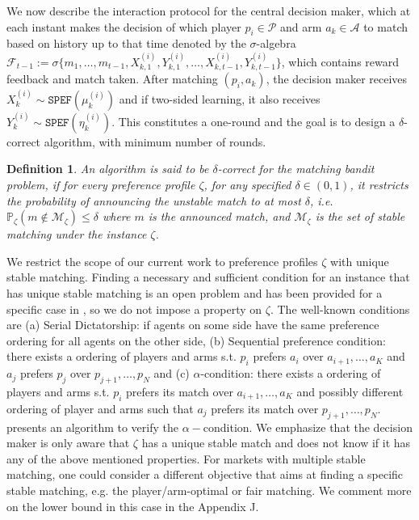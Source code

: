\documentclass{article}
\newtheorem{definition}[theorem]{Definition}
\begin{document}
We now describe the interaction protocol for the central decision maker, which at each instant makes the decision of which player $p_i\in \mathcal{P}$ and arm $a_k\in\mathcal{A}$ to match based on history up to that time denoted by the $\sigma$-algebra $\mathcal{F}_{t-1}:=\sigma\{m_{1},\ldots,m_{t-1},X^{(i)}_{k,1},Y^{(i)}_{k,1},\ldots,X^{(i)}_{k,t-1},Y^{(i)}_{k,t-1}\}$, which contains reward feedback and match taken. After matching $(p_i,a_k)$, the decision maker receives $X^{(i)}_k\sim\texttt{SPEF}(\mu^{(i)}_k)$ and if two-sided learning, it also receives $Y^{(i)}_k\sim\texttt{SPEF}(\eta^{(i)}_k)$. This constitutes a one-round and the goal is to design a $\delta$-correct algorithm, with minimum number of rounds. 
\begin{definition}
    An algorithm is said to be $\delta$-correct for the matching bandit problem, if for every preference profile $\zeta$, for any specified $\delta\in(0,1)$, it restricts the probability of announcing the unstable match to at most $\delta$, i.e. $\mathbb{P}_{\zeta}(m\not\in\mathcal{M}_{\zeta})\leq \delta$ where $m$ is the announced match, and $\mathcal{M}_{\zeta}$ is the set of stable matching under the instance $\zeta$. 
\end{definition}
We restrict the scope of our current work to preference profiles $\zeta$ with unique stable matching. Finding a necessary and sufficient condition for an instance that has unique stable matching is an open problem and has been provided for a specific case in \cite{KARPOV201963}, so we do not impose a property on $\zeta$. The well-known conditions are (a) Serial Dictatorship: if agents on some side have the same preference ordering for all agents on the other side, (b)  Sequential preference condition: there exists a ordering of players and arms s.t. $p_i$ prefers $a_i$ over $a_{i+1},\ldots,a_K$ and $a_j$ prefers $p_j$ over $p_{j+1},\ldots,p_N$ and (c) $\alpha$-condition: there exists a ordering of players and arms s.t. $p_i$ prefers its match over $a_{i+1},\ldots,a_K$ and possibly different ordering of player and arms such that $a_j$ prefers its match over $p_{j+1},\ldots,p_N$. \cite{KARPOV201963} presents an algorithm to verify the $\alpha-$condition.
We emphasize that the decision maker is only aware that $\zeta$ has a unique stable match and does not know if it has any of the above mentioned properties. For markets with multiple stable matching, one could consider a different objective that aims at finding a specific stable matching, e.g. the player/arm-optimal or fair matching. We comment more on the lower bound in this case in the Appendix J. 
\end{document}
